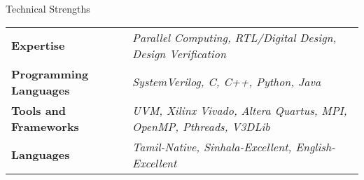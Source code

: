 \documentclass[
	11pt, %
]{./../assets/resume} %
\begin{document}
	




\begin{rSection}{Technical Strengths}

	\def\arraystretch{1.5}

	\begin{tabular}{ l l}
		\textbf{Expertise} & \emph{Parallel Computing, RTL/Digital Design, Design Verification} \\
		\textbf{Programming Languages} & \emph{SystemVerilog, C, C++, Python, Java} \\
		\textbf{Tools and Frameworks} & \emph{UVM, Xilinx Vivado, Altera Quartus, MPI, OpenMP, Pthreads, V3DLib} \\ 
		\textbf{Languages} & \emph{Tamil-Native, Sinhala-Excellent, English-Excellent} \\
	\end{tabular}

\end{rSection}
\end{document}
